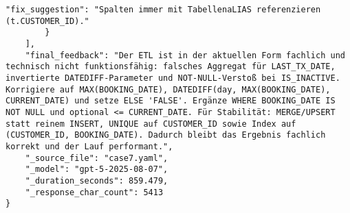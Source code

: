 \begin{lstlisting}[caption={Ausgabe: GPT-5 Anwendungsfall 7 Hauptdurchlauf},label={gpt_case7_prompt1}]
            "fix_suggestion": "Spalten immer mit TabellenaLIAS referenzieren (t.CUSTOMER_ID)."
        }
    ],
    "final_feedback": "Der ETL ist in der aktuellen Form fachlich und technisch nicht funktionsfähig: falsches Aggregat für LAST_TX_DATE, invertierte DATEDIFF-Parameter und NOT-NULL-Verstoß bei IS_INACTIVE. Korrigiere auf MAX(BOOKING_DATE), DATEDIFF(day, MAX(BOOKING_DATE), CURRENT_DATE) und setze ELSE 'FALSE'. Ergänze WHERE BOOKING_DATE IS NOT NULL und optional <= CURRENT_DATE. Für Stabilität: MERGE/UPSERT statt reinem INSERT, UNIQUE auf CUSTOMER_ID sowie Index auf (CUSTOMER_ID, BOOKING_DATE). Dadurch bleibt das Ergebnis fachlich korrekt und der Lauf performant.",
    "_source_file": "case7.yaml",
    "_model": "gpt-5-2025-08-07",
    "_duration_seconds": 859.479,
    "_response_char_count": 5413
}
\end{lstlisting}

